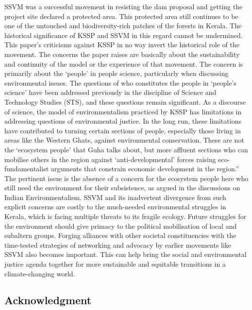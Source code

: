 \documentclass[twoside, 13pt]{article}
\begin{document}
{{{{{SSVM was a successful movement in resisting the dam proposal and getting the project site declared a protected area. This protected area still continues to be one of the untouched and biodiversity-rich patches of the forests in Kerala. The historical significance of KSSP and SSVM in this regard cannot be undermined. This paper's criticisms against KSSP in no way invert the historical role of the movement. The concerns the paper raises are basically about the sustainability and continuity of the model or the experience of that movement. The concern is primarily about the ‘people’ in people science, particularly when discussing environmental issues. The questions of who constitutes the people in ‘people’s science’ have been addressed previously in the discipline of Science and Technology Studies (STS), and these questions remain significant. As a discourse of science, the model of environmentalism practiced by KSSP has limitations in addressing questions of environmental justice. In the long run, these limitations have contributed to turning certain sections of people, especially those living in areas like the Western Ghats, against environmental conservation. These are not the ‘ecosystem people’ that Guha talks about, but more affluent sections who can mobilise others in the region against ‘anti-developmental’ forces raising eco-fundamentalist arguments that constrain economic development in the region.” The pertinent issue is the absence of a concern for the ecosystem people here who still need the environment for their subsistence, as argued in the discussions on Indian Environmentalism. SSVM and its inadvertent divergence from such explicit concerns are costly to the much-needed environmental struggles in Kerala, which is facing multiple threats to its fragile ecology. Future struggles for the environment should give primacy to the political mobilisation of local and subaltern groups. Forging alliances with other societal constituencies with the time-tested strategies of networking and advocacy by earlier movements like SSVM also becomes important. This can help bring the social and environmental justice agenda together for more sustainable and equitable transitions in a climate-changing world.}

\vspace{-.2cm}

{\fontsize{8}{10}\selectfont\subsection*{Acknowledgment}}

}}}}
\end{document}
